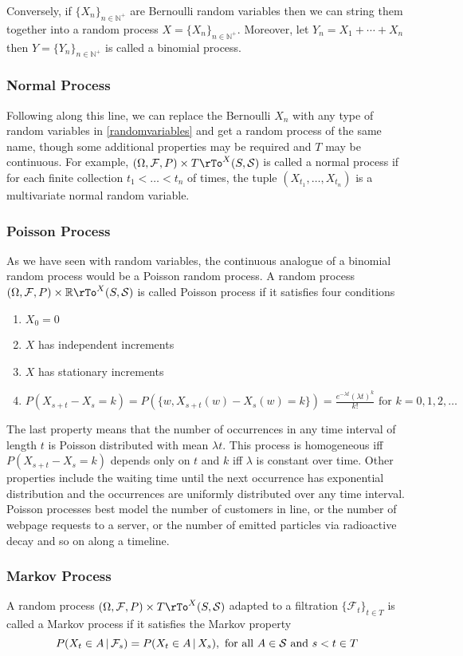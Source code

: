 \documentclass[12pt]{amsart}
\theoremstyle{definition}
\begin{document}
Conversely, if $\{X_n\}_{n \in \mathbb{N}^+}$ are Bernoulli random variables then we can string them together into a random process $X = \{X_n\}_{n \in \mathbb{N}^+}$. Moreover, let $Y_n = X_1 + \cdots + X_n$ then $Y = \{Y_n\}_{n \in \mathbb{N}^+}$ is called a binomial process.
\subsubsection{Normal Process} Following along this line, we can replace the Bernoulli $X_n$ with any type of random variables in \ref{randomvariables} and get a random process of the same name, though some additional properties may be required and $T$ may be continuous.  For example, $(\Omega, \mathcal{F}, P) \times T \rTo^X (S, \mathcal{S})$ is called a normal process if for each finite collection $t_1 < \dots < t_n$ of times, the tuple $(X_{t_1}, \dots , X_{t_n})$ is a multivariate normal random variable.
\subsubsection{Poisson Process} As we have seen with random variables, the continuous analogue of a binomial random process would be a Poisson random process. A random process $(\Omega, \mathcal{F}, P) \times \mathbb{R} \rTo^X (S, \mathcal{S})$ is called Poisson process if it satisfies four conditions
\begin{enumerate}[1.]
\item $X_0 = 0$
\item $X$ has independent increments
\item $X$ has stationary increments
\item $P(X_{s + t} - X_s= k) = P(\{ w, X_{s + t}(w) - X_s(w) = k\}) = \frac{e^{-\lambda t}(\lambda t)^k}{k!} \text{ for } k = 0, 1, 2, \dots$
\end{enumerate}

The last property means that the number of occurrences in any time interval of length $t$ is Poisson distributed with mean $\lambda t$. This process is homogeneous iff $P(X_{s + t} - X_s = k)$ depends only on $t$ and $k$ iff $\lambda$ is constant over time. Other properties include the waiting time until the next occurrence has exponential distribution and the occurrences are uniformly distributed over any time interval. Poisson processes best model the number of customers in line, or the number of webpage requests to a server, or the number of emitted particles via radioactive decay and so on along a timeline.
\subsubsection{Markov Process} A random process $(\Omega, \mathcal{F}, P) \times T \rTo^X (S, \mathcal{S})$ adapted to a filtration $\{\mathcal{F}_t\}_{t \in T}$ is called a Markov process if it satisfies the Markov property
$$P(X_t \in A \,|\, \mathcal{F}_s) = P(X_t \in A \,|\, X_s), \textnormal{ for all } A \in \mathcal{S} \text{ and } s < t \in T$$
\end{document}

